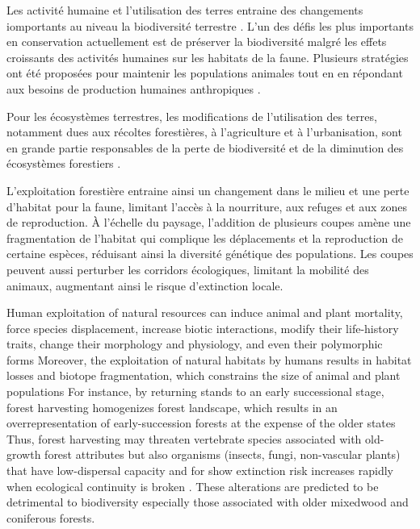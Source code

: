 Les activité humaine et l'utilisation des terres entraine des changements iomportants au niveau la biodiversité terrestre \citep{Newbold2015Globaleffects}. 
L'un des défis les plus importants en conservation actuellement est de préserver la biodiversité malgré les effets croissants des activités humaines sur les habitats de la faune.
Plusieurs stratégies ont été proposées pour maintenir les populations animales tout en en répondant aux besoins de production humaines anthropiques \citep{Lindenmayer2006Generalmanagement}.

Pour les écosystèmes terrestres, les modifications de l'utilisation des terres, notamment dues aux récoltes forestières, à l'agriculture et à l'urbanisation, sont en grande partie responsables de la perte de biodiversité et de la diminution des écosystèmes forestiers \citep{Sala2000Globalbiodiversity,Naeem2012functionsbiological,Bichet2016Maintaininganimal}.

L'exploitation forestière entraine ainsi un changement dans le milieu et une perte d'habitat pour la faune, limitant l'accès à la nourriture, aux refuges et aux zones de reproduction. 
À l'échelle du paysage, l'addition de plusieurs coupes amène une fragmentation de l'habitat qui complique les déplacements et la reproduction de certaine espèces, réduisant ainsi la diversité génétique des populations. 
Les coupes peuvent aussi perturber les corridors écologiques, limitant la mobilité des animaux, augmentant ainsi le risque d'extinction locale. 

Human exploitation of natural resources can induce animal and plant mortality, force species displacement, increase biotic interactions, modify their life-history traits, change their morphology and physiology, and even their polymorphic forms \citep{Sergio2018Animalresponses}
Moreover, the exploitation of natural habitats by humans results in habitat losses and biotope fragmentation, which constrains the size of animal and plant populations \citep{Coelho2020Effectsanthropogenic}
For instance, by returning stands to an early successional stage, forest harvesting homogenizes forest landscape, which results in an overrepresentation of early-succession forests at the expense of the older states \citep{Cyr2009Forestmanagement,Boucher2017Cumulativepatterns}
Thus, forest harvesting may threaten vertebrate species associated with old-growth forest attributes but also organisms (insects, fungi, non-vascular plants) that have low-dispersal capacity and for show extinction risk increases rapidly when ecological continuity is broken \citep{Norden2001Conceptualproblems,Martin2021indicatorspecies}.
These alterations are predicted to be detrimental to biodiversity especially those associated with older mixedwood and coniferous forests. \citep{Tremblay2018Harvestinginteracts,Cadieux2020Projectedeffects}



